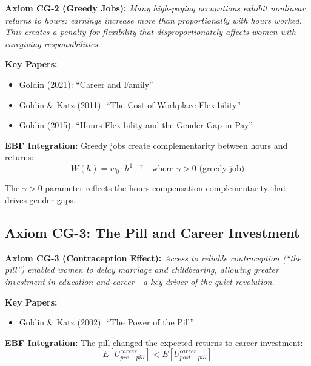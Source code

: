 \begin{tcolorbox}[colback=blue!5!white, colframe=blue!75!black]
\textbf{Axiom CG-2 (Greedy Jobs):}
\textit{Many high-paying occupations exhibit nonlinear returns to hours:
earnings increase more than proportionally with hours worked. This creates
a penalty for flexibility that disproportionately affects women with
caregiving responsibilities.}
\end{tcolorbox}

\textbf{Key Papers:}
\begin{itemize}[nosep]
    \item Goldin (2021): ``Career and Family''
    \item Goldin \& Katz (2011): ``The Cost of Workplace Flexibility''
    \item Goldin (2015): ``Hours Flexibility and the Gender Gap in Pay''
\end{itemize}

\textbf{EBF Integration:}
Greedy jobs create complementarity between hours and returns:
\begin{equation}
W(h) = w_0 \cdot h^{1+\gamma} \quad \text{where } \gamma > 0 \text{ (greedy job)}
\end{equation}

The $\gamma > 0$ parameter reflects the hours-compensation complementarity that
drives gender gaps.

\subsection{Axiom CG-3: The Pill and Career Investment}

\begin{tcolorbox}[colback=blue!5!white, colframe=blue!75!black]
\textbf{Axiom CG-3 (Contraception Effect):}
\textit{Access to reliable contraception (``the pill'') enabled women to
delay marriage and childbearing, allowing greater investment in education
and career---a key driver of the quiet revolution.}
\end{tcolorbox}

\textbf{Key Papers:}
\begin{itemize}[nosep]
    \item Goldin \& Katz (2002): ``The Power of the Pill''
\end{itemize}

\textbf{EBF Integration:}
The pill changed the expected returns to career investment:
\begin{equation}
E[U^{career}_{pre-pill}] < E[U^{career}_{post-pill}]
\end{equation}

